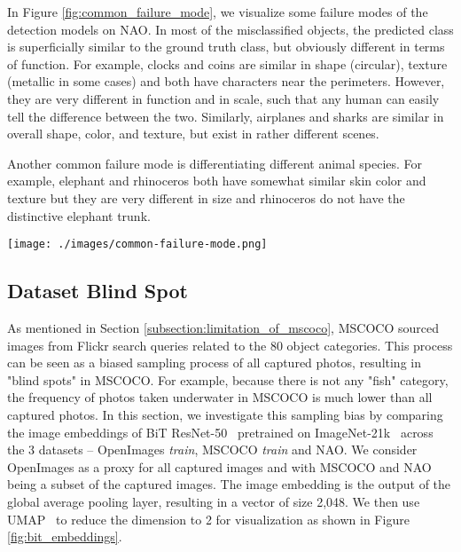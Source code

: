 \documentclass[final]{cvpr}
\begin{document}
In Figure \ref{fig:common_failure_mode}, we visualize some failure modes of the detection models on NAO. In most of the misclassified objects, the predicted class is superficially similar to the ground truth class, but obviously different in terms of function. For example, clocks and coins are similar in shape (circular), texture (metallic in some cases) and both have characters near the perimeters. However, they are very different in function and in scale, such that any human can easily tell the difference between the two.
Similarly, airplanes and sharks are similar in overall shape, color, and texture, but exist in rather different scenes.

Another common failure mode is differentiating different animal species. For example, elephant and rhinoceros both have somewhat similar skin color and texture but they are very different in size and rhinoceros do not have the distinctive elephant trunk.

\begin{figure*}[t]
\begin{center}
   \texttt{[image: ./images/common-failure-mode.png]}
\end{center}
   \caption{Selected samples to showcase common failure modes.}
\label{fig:long}
\label{fig:onecol}
\label{fig:common_failure_mode}
\end{figure*}

\subsection{Dataset Blind Spot}

As mentioned in Section \ref{subsection:limitation_of_mscoco}, MSCOCO sourced images from Flickr search queries related to the 80 object categories. This process can be seen as a biased sampling process of all captured photos, resulting in "blind spots" in MSCOCO. For example, because there is not any "fish" category, the frequency of photos taken underwater in MSCOCO is much lower than all captured photos. In this section, we investigate this sampling bias by comparing the image embeddings of BiT ResNet-50~\cite{Kolesnikov2019-qu} pretrained on ImageNet-21k~\cite{russakovsky2015imagenet} across the 3 datasets -- OpenImages \textit{train}, MSCOCO \textit{train} and NAO. We consider OpenImages as a proxy for all captured images and with MSCOCO and NAO being a subset of the captured images. The image embedding is the output of the global average pooling layer, resulting in a vector of size 2,048. We then use UMAP~\cite{McInnes2018-ph} to reduce the dimension to 2 for visualization as shown in Figure \ref{fig:bit_embeddings}.
\end{document}
